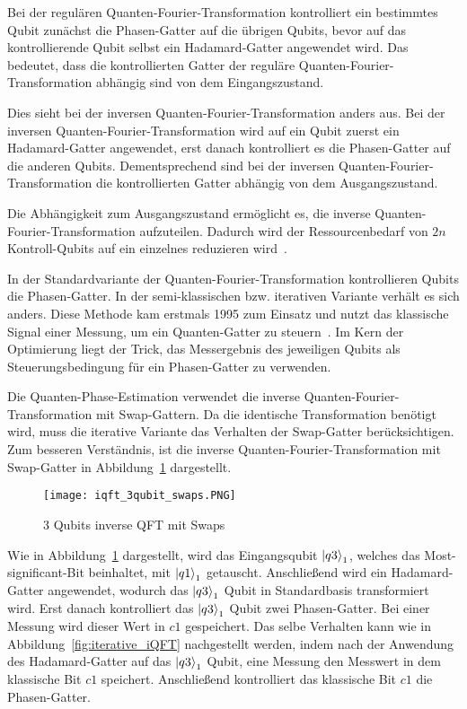 Bei der regulären Quanten-Fourier-Transformation kontrolliert ein bestimmtes Qubit zunächst die Phasen-Gatter auf die übrigen Qubits, 
bevor auf das kontrollierende Qubit selbst ein Hadamard-Gatter angewendet wird.
Das bedeutet, dass die kontrollierten Gatter der reguläre Quanten-Fourier-Transformation abhängig sind von dem Eingangszustand.

Dies sieht bei der inversen Quanten-Fourier-Transformation anders aus.
Bei der inversen Quanten-Fourier-Transformation wird auf ein Qubit zuerst ein Hadamard-Gatter angewendet, 
erst danach kontrolliert es die Phasen-Gatter auf die anderen Qubits.
Dementsprechend sind bei der inversen Quanten-Fourier-Transformation die kontrollierten Gatter abhängig von dem Ausgangszustand.

Die Abhängigkeit zum Ausgangszustand ermöglicht es, 
die inverse Quanten-Fourier-Transformation aufzuteilen.
Dadurch wird der Ressourcenbedarf von \(2n\) Kontroll-Qubits auf ein einzelnes reduzieren wird~\cite{Parker2000}.

In der Standardvariante der Quanten-Fourier-Transformation kontrollieren Qubits die Phasen-Gatter.
In der semi-klassischen bzw. iterativen Variante verhält es sich anders.
Diese Methode kam erstmals 1995 zum Einsatz und 
nutzt das klassische Signal einer Messung, 
um ein Quanten-Gatter zu steuern~\cite{Griffiths_1996}.
Im Kern der Optimierung liegt der Trick, 
das Messergebnis des jeweiligen Qubits als Steuerungsbedingung für ein Phasen-Gatter zu verwenden.

Die Quanten-Phase-Estimation verwendet die inverse Quanten-Fourier-Transformation mit Swap-Gattern.
Da die identische Transformation benötigt wird, 
muss die iterative Variante das Verhalten der Swap-Gatter berücksichtigen.
Zum besseren Verständnis, 
ist die inverse Quanten-Fourier-Transformation mit Swap-Gatter in Abbildung~\ref{fig:iQFTswaps} dargestellt.
\begin{figure} [H]
  \caption{3 Qubits inverse QFT mit Swaps}
  \label{fig:iQFTswaps}
  \texttt{[image: iqft\_3qubit\_swaps.PNG]}
  \centering
  \end{figure}
Wie in Abbildung~\ref{fig:iQFTswaps} dargestellt, 
wird das Eingangsqubit \(\ket{q3}_1\), welches das Most-significant-Bit beinhaltet, 
mit \(\ket{q1}_1\) getauscht. 
Anschließend wird ein Hadamard-Gatter angewendet, 
wodurch das \(\ket{q3}_1\) Qubit in Standardbasis transformiert wird. 
Erst danach kontrolliert das \(\ket{q3}_1\) Qubit zwei Phasen-Gatter.
Bei einer Messung wird dieser Wert in \(c1\) gespeichert.
Das selbe Verhalten kann wie in Abbildung~\ref{fig:iterative_iQFT} nachgestellt werden, 
indem nach der Anwendung des Hadamard-Gatter auf das \(\ket{q3}_1\) Qubit, 
eine Messung den Messwert in dem klassische Bit \(c1\) speichert.
Anschließend kontrolliert das klassische Bit \(c1\) die Phasen-Gatter.

